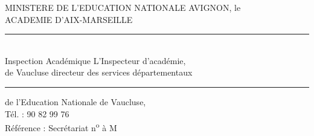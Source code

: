 MINISTERE DE L'EDUCATION NATIONALE \hfill AVIGNON, le\\
ACADEMIE D'AIX-MARSEILLE\\
\rule{1.3cm}{0.3pt}\\
Inspection Académique \hfill L'Inspecteur d'académie,\\
de Vaucluse \hfill directeur des services départementaux\\
\rule{1.3cm}{0.3pt}\hfill de l'Education Nationale de Vaucluse,\\
Tél. : 90 82 99 76\\
Référence : Secrétariat n\textsuperscript{o} \hfill à M

